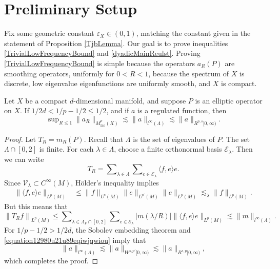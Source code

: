 \section{Preliminary Setup} \label{PrelimSetup}

Fix some geometric constant $\varepsilon_X \in (0,1)$, matching the constant given in the statement of Proposition \ref{TjbLemma}. Our goal is to prove inequalities \eqref{TrivialLowFrequencyBound} and \eqref{dyadicMainReulst}. Proving \eqref{TrivialLowFrequencyBound} is simple because the operators $a_R(P)$ are smoothing operators, uniformly for $0 < R < 1$, because the spectrum of $X$ is discrete, low eigenvalue eigenfunctions are uniformly smooth, and $X$ is compact.

\begin{lemma} \label{lowjLemma}
    Let $X$ be a compact $d$-dimensional manifold, and suppose $P$ is an elliptic operator on $X$. If $1/2d < 1/p - 1/2 \leq 1/2$, and if $a$ is a regulated function, then
    \[ \sup\nolimits_{R \leq 1} \| a_R \|_{M^p_{\text{Dil}}(X)} \lesssim \| a \|_{l^\infty(\Lambda)} \lesssim \| a \|_{R^{p,s}[0,\infty)}. \]
\end{lemma}
\begin{proof}
    Let $T_R = m_R(P)$. Recall that $\Lambda$ is the set of eigenvalues of $P$. The set $\Lambda \cap [0,2]$ is finite. For each $\lambda \in \Lambda$, choose a finite orthonormal basis $\mathcal{E}_\lambda$. Then we can write
    \begin{equation}
        T_R = \sum\nolimits_{\lambda \in \Lambda} \sum\nolimits_{e \in \mathcal{E}_\lambda} \langle f, e \rangle e.
    \end{equation}
    Since $\mathcal{V}_\lambda \subset C^\infty(M)$, H\"{o}lder's inequality implies
    \begin{equation}
    \begin{split}
        \| \langle f, e \rangle e \|_{L^p(M)} &\leq \| f \|_{L^p(M)} \| e \|_{L^{p'}(M)} \| e \|_{L^p(M)} \lesssim_\lambda \| f \|_{L^p(M)}.
    \end{split}
    \end{equation}
    But this means that
    \begin{equation}
        \left\| T_R f \right\|_{L^p(M)} \leq \sum\nolimits_{\lambda \in \Lambda_P \cap [0,2]} \sum\nolimits_{e \in \mathcal{E}_\lambda} |m(\lambda/R)| \| \langle f, e \rangle e \|_{L^p(M)} \lesssim \| m \|_{l^\infty(\Lambda)}.
    \end{equation}
    For $1/p - 1/2 > 1/2d$, the Sobolev embedding theorem and \eqref{equation12980u21u89eqiwjqwiou} imply that
    \begin{equation}
        \| a \|_{l^\infty(\Lambda)} \lesssim \| a \|_{W^{s,p'}[0,\infty)} \lesssim \| a \|_{R^{s,p}[0,\infty)},
    \end{equation}
    which completes the proof.
\end{proof}


